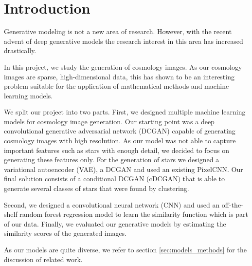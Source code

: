 \documentclass[10pt,conference,compsocconf]{IEEEtran}
\newcommand\TODO[1]{\textcolor{red}{#1}} %
\begin{document}
\section{Introduction}
\label{sec:introduction}
Generative modeling is not a new area of research. However, with the recent advent of deep generative models the research interest in this area has increased drastically. 

In this project, we study the generation of cosmology images. As our cosmology images are sparse, high-dimensional data, this has shown to be an interesting problem suitable for the application of mathematical methods and machine learning models.

We split our project into two parts. First, we designed multiple machine learning models for cosmology image generation. Our starting point was a deep convolutional generative adversarial network (DCGAN) capable of generating cosmology images with high resolution. As our model was not able to capture important features such as stars with enough detail, we decided to focus on generating these features only. For the generation of stars we designed a variational autoencoder (VAE), a DCGAN and used an existing PixelCNN. Our final solution consists of a conditional DCGAN (cDCGAN) that is able to generate several classes of stars that were found by clustering.

Second, we designed a convolutional neural network (CNN) and used an off-the-shelf random forest regression model to learn the similarity function which is part of our data. Finally, we evaluated our generative models by estimating the similarity scores of the generated images. 


As our models are quite diverse, we refer to section \ref{sec:models_methods} for the discussion of related work.


\end{document}
